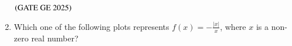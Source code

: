 \documentclass[journal,12pt,onecolumn]{IEEEtran}
\theoremstyle{remark}
\begin{document}
\begin{enumerate}
\begin{enumerate}
\end{enumerate}
\hfill $\left(\text{GATE GE 2025}\right)$
\bigskip
\item Which one of the following plots represents $f(x) = -\frac{|x|}{x}$, where $x$ is a non-zero real number?
\begin{enumerate}
\end{enumerate}
\end{enumerate}
\end{document}
